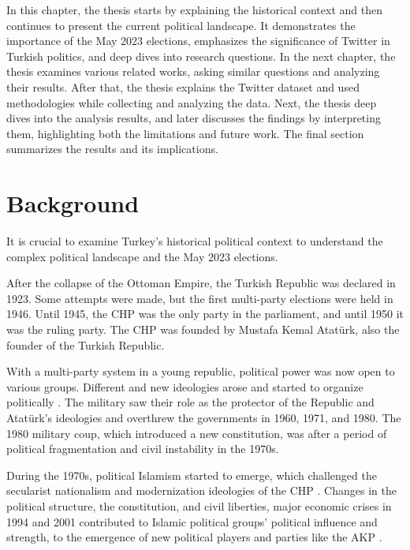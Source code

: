 In this chapter, the thesis starts by explaining the historical context and then continues 
to present the current political landscape. It demonstrates the importance of the May 2023 elections, 
emphasizes the significance of Twitter in Turkish politics, and deep dives into research questions. 
In the next chapter, the thesis examines various related works, asking similar questions and 
analyzing their results. After that, the thesis explains the Twitter dataset and used methodologies 
while collecting and analyzing the data. Next, the thesis deep dives into the analysis results, 
and later discusses the findings by interpreting them, highlighting both the limitations and future work. 
The final section summarizes the results and its implications.

\section{Background}

It is crucial to examine Turkey's historical political context to understand 
the complex political landscape and the May 2023 elections.

After the collapse of the Ottoman Empire, the Turkish Republic was declared in 1923.
Some attempts were made, but the first multi-party elections were held in 1946. 
Until 1945, the \ac{CHP} was the only party in the parliament, and until 1950 it was the ruling party.
The \ac{CHP} was founded by Mustafa Kemal Atatürk, also the founder of the Turkish Republic.

With a multi-party system in a young republic, political power was now open to various groups.
Different and new ideologies arose and started to organize politically \parencite{rise_of_islam_turkey}.
The military saw their role as the protector of the Republic and Atatürk's ideologies 
and overthrew the governments in 1960, 1971, and 1980.
The 1980 military coup, which introduced a new constitution, was after a period of
political fragmentation and civil instability in the 1970s. 

During the 1970s, political Islamism started to emerge, which challenged 
the secularist nationalism and modernization ideologies of the \ac{CHP} \parencite{erdoganism_akp_after_15_years}. 
Changes in the political structure, the constitution, and civil liberties, major economic crises in 1994 and 2001 \parencite{financial_crisis_turkey_1994}
contributed to Islamic political groups' political influence and strength, 
to the emergence of new political players and parties like the \ac{AKP} \parencite{rise_of_islam_turkey}.

